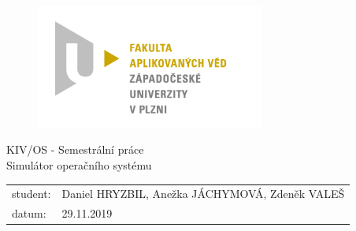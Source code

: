 \documentclass[11pt,a4paper]{scrartcl}
\begin{document}
	\begin{figure}[h!]
		\centering
		\includegraphics[bb= 0 0 820 445 , width=75mm]{favlogo.jpg}
	\end{figure}
	
	\vspace{5cm}
	
	{\centering
		{\huge KIV/OS - Semestrální práce}\\[1em]
		{\large Simulátor operačního systému}\\[7,5cm]
	}
	
	\begin{center}
		\begin{tabular}{l l}
		student: & Daniel HRYZBIL, Anežka JÁCHYMOVÁ, Zdeněk VALEŠ\\
		datum: & 29.11.2019 \\
		\end{tabular}
	\end{center}
	
	\thispagestyle{empty}
	\newpage
	
\end{document}
